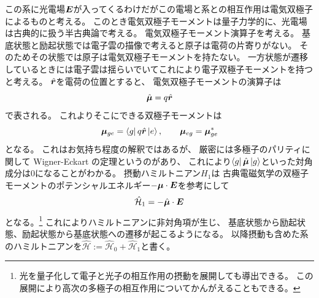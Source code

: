 \documentclass[11pt,dvipdfmx,a4paper]{jsarticle}
\begin{document}
この系に光電場\(\vb*{E}\)が入ってくるわけだがこの電場と系との相互作用は電気双極子によるものと考える。
このとき電気双極子モーメントは量子力学的に、光電場は古典的に扱う半古典論で考える。
電気双極子モーメント演算子を考える。
基底状態と励起状態では電子雲の描像で考えると原子は電荷の片寄りがない。
そのためその状態では原子は電気双極子モーメントを持たない。
一方状態が遷移しているときには電子雲は揺らいでいてこれにより電子双極子モーメントを持つと考える。
\(\hat{\vb*{r}}\)を電荷の位置とすると、
電気双極子モーメントの演算子は
\begin{equation}
	\hat{\vb*{\mu}} = q \hat{\vb*{r}}
\end{equation}
で表される。
これよりそこにできる双極子モーメントは
\begin{equation}
	\vb*{\mu}_{ge} = \bra{g}q\hat{\vb*{r}}\ket{e},\qquad \vb*{\mu}_{eg} = \vb*{\mu}_{ge}^{*}
\end{equation}
となる。
これはお気持ち程度の解釈ではあるが、
厳密には多極子のパリティに関して Wigner-Eckart の定理というのがあり、
これにより\(\bra{g}\hat{\vb*{\mu}}\ket{g}\)といった対角成分は\(0\)になることがわかる。
摂動ハミルトニアン\(H_1\)は
古典電磁気学の双極子モーメントのポテンシャルエネルギー\(-\vb*{\mu}\cdot\vb*{E}\)を参考にして
\begin{equation}
	\hat{\mathcal{H}}_1 = - \hat{\vb*{\mu}}\cdot\vb*{E}
\end{equation}
となる。\footnote{光を量子化して電子と光子の相互作用の摂動を展開しても導出できる。
この展開により高次の多極子の相互作用についてかんがえることもできる。}
これによりハミルトニアンに非対角項が生じ、
基底状態から励起状態、励起状態から基底状態への遷移が起こるようになる。
以降摂動も含めた系のハミルトニアンを\(\hat{\mathcal{H}} := \hat{\mathcal{H}}_0 + \hat{\mathcal{H}}_1\)と書く。
\end{document}
